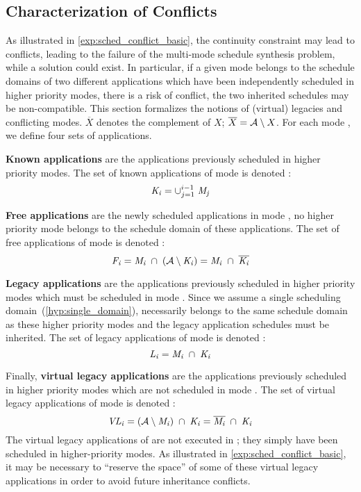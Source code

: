 \subsection{Characterization of Conflicts}
\label{subsec:conflict_def}

As illustrated in \cref{exp:sched_conflict_basic}, the continuity constraint may lead to conflicts, leading to the failure of the multi-mode schedule synthesis problem, while a solution could exist.
In particular, if a given mode \mode{} belongs to the schedule domains of two different applications which have been independently scheduled in higher priority modes, there is a risk of conflict, \ie the two inherited schedules may be non-compatible.
This section formalizes the notions of (virtual) legacies and conflicting modes.
$\overline{X}$ denotes the complement of $X$; \ie $\overline{X} = \mathcal{A} \setminus X$.
For each mode \modei, we define four sets of applications.

\textbf{Known applications} are the applications previously scheduled in higher priority modes. The set of known applications of mode \modei is denoted \knownAppi:
	\begin{equation}
	\mathit{K_{i}} = \cup_{j = 1}^{i-1} \; \mathit{M_{j}}
	\end{equation}

\textbf{Free applications} are the newly scheduled applications in mode \modei, \ie no higher priority mode belongs to the schedule domain of these applications.
	The set of free applications of mode \modei is denoted \freeAppi :
	\begin{equation}
	\mathit{F_{i}} = \mathit{M_{i}} \; \cap \; (\mathcal{A} \setminus \mathit{K_{i}}) = \mathit{M_{i}} \; \cap \; \overline{\mathit{K_{i}}}
	\end{equation}

\textbf{Legacy applications} are the applications previously scheduled in higher priority modes which must be scheduled in mode \modei.
	Since we assume a single scheduling domain~(\cref{hyp:single_domain}), \modei necessarily belongs to the same schedule domain as these higher priority modes and the legacy application schedules must be inherited.
	The set of legacy applications of mode \modei is denoted \legAppi:
	\begin{equation}
	\mathit{L_{i}} = \mathit{M_{i}} \; \cap \; {\mathit{K_{i}}}
	\end{equation}

Finally, \textbf{virtual legacy applications} are the applications previously scheduled in higher priority modes which are not scheduled in mode \modei.
	The set of virtual legacy applications of mode \modei is denoted \virtlegAppi:
	\begin{equation}
	\mathit{VL_{i}} = (\mathcal{A} \setminus \mathit{M_{i}})\; \cap \; {\mathit{K_{i}}} = \overline{\mathit{M_{i}}} \; \cap \; {\mathit{K_{i}}}
	\end{equation}
The virtual legacy applications of \modei are not executed in \modei; they simply have been scheduled in higher-priority modes. As illustrated in \cref{exp:sched_conflict_basic}, it may be necessary to ``reserve the space'' of some of these virtual legacy applications in order to avoid future inheritance conflicts.


